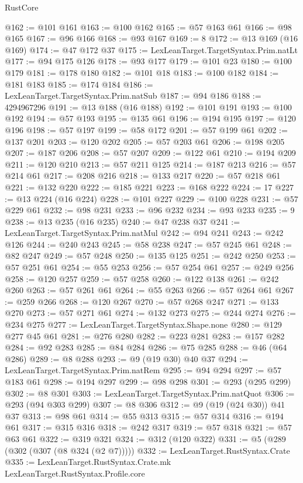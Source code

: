 \begin{lexlean}{RustCore}
\begin{coremodule}
@162 := @101 @161
@163 := @100 @162
@165 := @57 @163 @61
@166 := @98 @165
@167 := @96 @166
@168 := @93 @167
@169 := 8
@172 := @13 @169 (@16 @169)
@174 := @47 @172 @37
@175 := LexLeanTarget.TargetSyntax.Prim.natLt
@177 := @94 @175 @126
@178 := @93 @177
@179 := @101 @23
@180 := @100 @179
@181 := @178 @180
@182 := @101 @18
@183 := @100 @182
@184 := @181 @183
@185 := @174 @184
@186 := LexLeanTarget.TargetSyntax.Prim.natSub
@187 := @94 @186
@188 := 4294967296
@191 := @13 @188 (@16 @188)
@192 := @101 @191
@193 := @100 @192
@194 := @57 @193
@195 := @135 @61
@196 := @194 @195
@197 := @120 @196
@198 := @57 @197
@199 := @58 @172
@201 := @57 @199 @61
@202 := @137 @201
@203 := @120 @202
@205 := @57 @203 @61
@206 := @198 @205
@207 := @187 @206
@208 := @57 @207
@209 := @122 @61
@210 := @194 @209
@211 := @120 @210
@213 := @57 @211 @125
@214 := @187 @213
@216 := @57 @214 @61
@217 := @208 @216
@218 := @133 @217
@220 := @57 @218 @61
@221 := @132 @220
@222 := @185 @221
@223 := @168 @222
@224 := 17
@227 := @13 @224 (@16 @224)
@228 := @101 @227
@229 := @100 @228
@231 := @57 @229 @61
@232 := @98 @231
@233 := @96 @232
@234 := @93 @233
@235 := 9
@238 := @13 @235 (@16 @235)
@240 := @47 @238 @37
@241 := LexLeanTarget.TargetSyntax.Prim.natMul
@242 := @94 @241
@243 := @242 @126
@244 := @240 @243
@245 := @58 @238
@247 := @57 @245 @61
@248 := @82 @247
@249 := @57 @248
@250 := @135 @125
@251 := @242 @250
@253 := @57 @251 @61
@254 := @55 @253
@256 := @57 @254 @61
@257 := @249 @256
@258 := @120 @257
@259 := @57 @258
@260 := @122 @138
@261 := @242 @260
@263 := @57 @261 @61
@264 := @55 @263
@266 := @57 @264 @61
@267 := @259 @266
@268 := @120 @267
@270 := @57 @268 @247
@271 := @133 @270
@273 := @57 @271 @61
@274 := @132 @273
@275 := @244 @274
@276 := @234 @275
@277 := LexLeanTarget.TargetSyntax.Shape.none
@280 := @129 @277 @45 @61
@281 := @276 @280
@282 := @223 @281
@283 := @157 @282
@284 := @92 @283
@285 := @84 @284
@286 := @75 @285
@288 := @46 (@64 @286)
@289 := @8 @288
@293 := @9 (@19 @30) @40 @37
@294 := LexLeanTarget.TargetSyntax.Prim.natRem
@295 := @94 @294
@297 := @57 @183 @61
@298 := @194 @297
@299 := @98 @298
@301 := @293 (@295 @299)
@302 := @8 @301
@303 := LexLeanTarget.TargetSyntax.Prim.natQuot
@306 := @293 (@94 @303 @299)
@307 := @8 @306
@312 := @9 (@19 (@24 @30)) @41 @37
@313 := @98 @61
@314 := @55 @313
@315 := @57 @314
@316 := @194 @61
@317 := @315 @316
@318 := @242 @317
@319 := @57 @318
@321 := @57 @63 @61
@322 := @319 @321
@324 := @312 (@120 @322)
@331 := @5 (@289 (@302 (@307 (@8 @324 (@2 @7)))))
@332 := LexLeanTarget.RustSyntax.Crate
@335 := LexLeanTarget.RustSyntax.Crate.mk LexLeanTarget.RustSyntax.Profile.core

\end{coremodule}
\end{lexlean}
